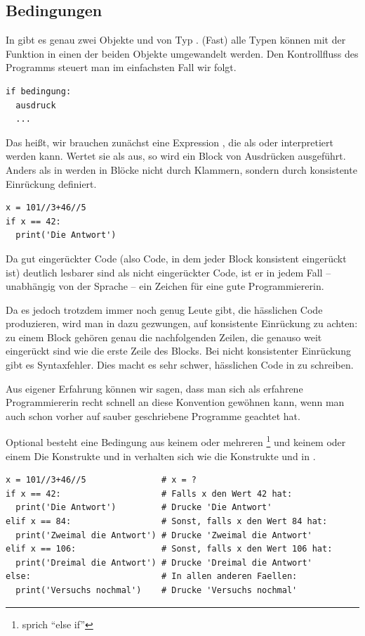 \subsection{Bedingungen}
\label{section:crashkurs:bedingungen}
In \Python gibt es genau zwei Objekte  und  von Typ .
(Fast) alle Typen können mit der Funktion  in einen der beiden Objekte umgewandelt werden.
Den Kontrollfluss des Programms steuert man im einfachsten Fall wir folgt.
\begin{lstlisting}
if bedingung:
  ausdruck
  ...
\end{lstlisting}
Das heißt, wir brauchen zunächst eine Expression , die als  oder  interpretiert werden kann.
Wertet sie als  aus, so wird ein Block von Ausdrücken ausgeführt.
Anders als in \CC werden in \Python Blöcke nicht durch Klammern, sondern durch konsistente Einrückung definiert.
\begin{lstlisting}
x = 101//3+46//5
if x == 42:
  print('Die Antwort')
\end{lstlisting}
Da gut eingerückter Code (also Code, in dem jeder Block konsistent eingerückt ist) deutlich lesbarer sind als nicht eingerückter
Code, ist er in jedem Fall -- unabhängig von der Sprache -- ein Zeichen für eine gute Programmiererin. 

Da es jedoch trotzdem immer noch genug Leute gibt, die hässlichen Code produzieren, wird man in \Python dazu gezwungen, auf 
konsistente Einrückung zu achten: zu einem Block gehören genau die nachfolgenden Zeilen, die genauso weit eingerückt sind wie die 
erste Zeile des Blocks. Bei nicht konsistenter Einrückung gibt es Syntaxfehler. Dies macht es sehr schwer, hässlichen Code in
\Python zu schreiben.

Aus eigener Erfahrung können wir sagen, dass man sich als erfahrene \CC Programmiererin recht schnell an diese Konvention gewöhnen kann, 
wenn man auch schon vorher auf sauber geschriebene Programme geachtet hat.

Optional besteht eine Bedingung aus keinem oder mehreren \footnote{sprich ``else if''} und keinem oder einem 
Die Konstrukte  und  in \Python verhalten sich wie die Konstrukte  und  in \CC.
\begin{lstlisting}
x = 101//3+46//5               # x = ?
if x == 42:                    # Falls x den Wert 42 hat:
  print('Die Antwort')         # Drucke 'Die Antwort'
elif x == 84:                  # Sonst, falls x den Wert 84 hat:
  print('Zweimal die Antwort') # Drucke 'Zweimal die Antwort'
elif x == 106:                 # Sonst, falls x den Wert 106 hat:
  print('Dreimal die Antwort') # Drucke 'Dreimal die Antwort'
else:                          # In allen anderen Faellen:
  print('Versuchs nochmal')    # Drucke 'Versuchs nochmal'
\end{lstlisting}


